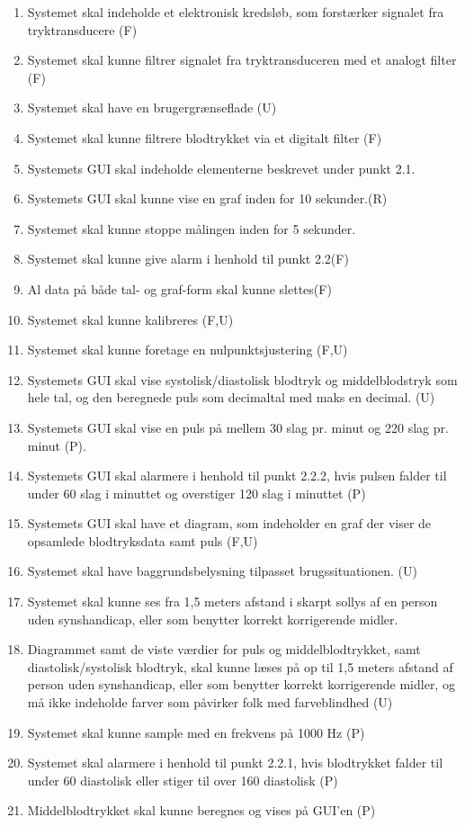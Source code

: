 \begin{enumerate}[4.1]
	\item Systemet skal indeholde et elektronisk kredsløb, som forstærker signalet fra tryktransducere (F)
	\item Systemet skal kunne filtrer signalet fra tryktransduceren med et analogt filter (F)
	\item Systemet skal have en brugergrænseflade (U)
	\item Systemet skal kunne filtrere blodtrykket via et digitalt filter (F)
	\item Systemets GUI skal indeholde elementerne beskrevet under punkt 2.1.  
	\item Systemets GUI skal kunne vise en graf inden for 10 sekunder.(R)
	\item Systemet skal kunne stoppe målingen inden for 5 sekunder.
	\item Systemet skal kunne give alarm i henhold til punkt 2.2(F)
	\item Al data på både tal- og graf-form skal kunne slettes(F)
	\item Systemet skal kunne kalibreres (F,U)
	\item Systemet skal kunne foretage en nulpunktsjustering (F,U)
	\item Systemets GUI skal vise systolisk/diastolisk blodtryk og middelblodstryk som hele tal, og den beregnede puls som decimaltal med maks en decimal. (U)
	\item Systemets GUI skal vise en puls på mellem 30 slag pr. minut og 220 slag pr. minut (P).
	\item Systemets GUI skal alarmere i henhold til punkt 2.2.2, hvis pulsen falder til under 60 slag i minuttet og overstiger 120 slag i minuttet (P)
	\item Systemets GUI skal have et diagram, som indeholder en graf der viser de opsamlede blodtryksdata samt puls (F,U)
	\item Systemet skal have baggrundsbelysning tilpasset brugssituationen. (U)
	\item Systemet skal kunne ses fra 1,5 meters afstand i skarpt sollys af en person uden synshandicap, eller som benytter korrekt korrigerende midler.
	\item Diagrammet samt de viste værdier for puls og middelblodtrykket, samt diastolisk/systolisk blodtryk, skal kunne læses på op til 1,5 meters afstand af person uden synshandicap, eller som benytter korrekt korrigerende midler, og må ikke indeholde farver som påvirker folk med farveblindhed (U)
	\item Systemet skal kunne sample med en frekvens på 1000 Hz (P)
	\item Systemet skal alarmere i henhold til punkt 2.2.1, hvis blodtrykket falder til under 60 diastolisk eller stiger til over 160 diastolisk (P)
	\item Middelblodtrykket skal kunne beregnes og vises på GUI’en (P)


\end{enumerate}
